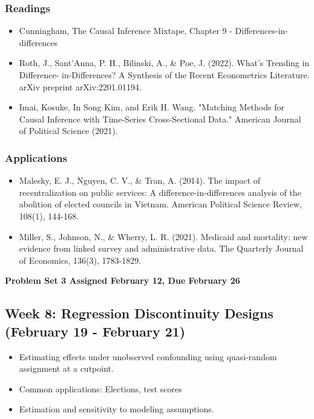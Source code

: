 \documentclass[11pt, article, oneside]{memoir}
\theoremstyle{Assumption}
\begin{document}
\subsubsection*{Readings}

\begin{itemize}
\item Cunningham, The Causal Inference Mixtape, Chapter 9 - Differences-in-differences
\item Roth, J., Sant'Anna, P. H., Bilinski, A., \& Poe, J. (2022). What's Trending in Difference- in-Differences? A Synthesis of the Recent Econometrics Literature. arXiv preprint arXiv:2201.01194.
\item Imai, Kosuke, In Song Kim, and Erik H. Wang. "Matching Methods for Causal Inference with Time‐Series Cross‐Sectional Data." American Journal of Political Science (2021).
\end{itemize}

\subsubsection*{Applications}

\begin{itemize}
\item Malesky, E. J., Nguyen, C. V., \& Tran, A. (2014). The impact of recentralization on public services: A difference-in-differences analysis of the abolition of elected councils in Vietnam. American Political Science Review, 108(1), 144-168.
\item Miller, S., Johnson, N., \& Wherry, L. R. (2021). Medicaid and mortality: new evidence from linked survey and administrative data. The Quarterly Journal of Economics, 136(3), 1783-1829.
\end{itemize}

\textbf{Problem Set 3  Assigned February 12, Due February 26}

\subsection{Week 8: Regression Discontinuity Designs (February 19 - February 21)}

\begin{itemize}
\item Estimating effects under unobserved confounding using quasi-random assignment at a cutpoint.
\item Common applications: Elections, test scores
\item Estimation and sensitivity to modeling assumptions.
\end{itemize}
\end{document}
